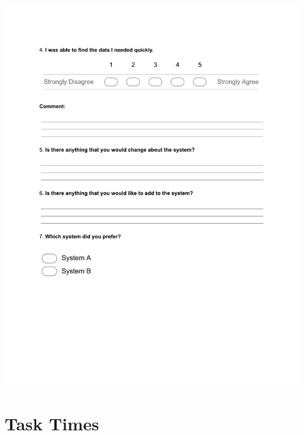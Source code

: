 \newpage
\begin{centering}
\includegraphics[trim = 40 160 0 60,scale=0.9]{forms/finalEvaluationPage2.pdf}
\end{centering}

\newpage
\section{Task Times}\label{sec:taskTimesFinal}

